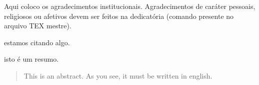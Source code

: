 
\begin{agradecimentos}

Aqui coloco os agradecimentos institucionais. Agradecimentos de car\'ater
pessoais, religiosos ou afetivos devem ser feitos na dedicat\'oria (comando 
presente no arquivo  TEX mestre).
 
\end{agradecimentos}


\begin{epigrafe}
estamos citando algo.
 
\end{epigrafe}


\begin{resumo}
 isto \'e um resumo.
\end{resumo}

\begin{abstract}
 This is an abstract. As you see, it must be written in english.
\end{abstract}

